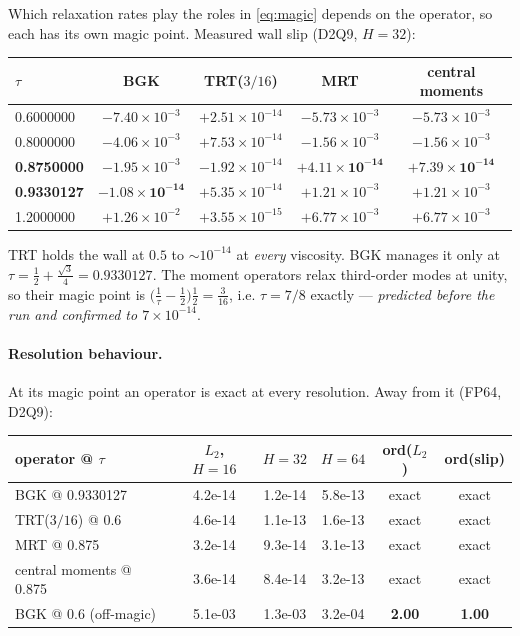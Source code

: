 \documentclass[11pt,a4paper]{article}
\begin{document}
Which relaxation rates play the roles in \eqref{eq:magic} depends on the operator,
so each has its own magic point. Measured wall slip (D2Q9, $H=32$):

\begin{center}\small
\begin{tabular}{lcccc}
\toprule
$\tau$ & BGK & TRT($3/16$) & MRT & central moments \\
\midrule
0.6000000 & $-7.40\times10^{-3}$ & $+2.51\times10^{-14}$ & $-5.73\times10^{-3}$ & $-5.73\times10^{-3}$ \\
0.8000000 & $-4.06\times10^{-3}$ & $+7.53\times10^{-14}$ & $-1.56\times10^{-3}$ & $-1.56\times10^{-3}$ \\
\textbf{0.8750000} & $-1.95\times10^{-3}$ & $-1.92\times10^{-14}$ & $\bm{+4.11\times10^{-14}}$ & $\bm{+7.39\times10^{-14}}$ \\
\textbf{0.9330127} & $\bm{-1.08\times10^{-14}}$ & $+5.35\times10^{-14}$ & $+1.21\times10^{-3}$ & $+1.21\times10^{-3}$ \\
1.2000000 & $+1.26\times10^{-2}$ & $+3.55\times10^{-15}$ & $+6.77\times10^{-3}$ & $+6.77\times10^{-3}$ \\
\bottomrule
\end{tabular}
\end{center}

\noindent TRT holds the wall at $0.5$ to $\sim10^{-14}$ at \emph{every} viscosity.
BGK manages it only at $\tau=\tfrac12+\tfrac{\sqrt3}{4}=0.9330127$. The moment
operators relax third-order modes at unity, so their magic point is
$\big(\tfrac{1}{\tau}-\tfrac12\big)\tfrac12=\tfrac{3}{16}$, i.e.
$\tau=7/8$ exactly --- \emph{predicted before the run and confirmed to
$7\times10^{-14}$}.

\paragraph{Resolution behaviour.} At its magic point an operator is exact at every
resolution. Away from it (FP64, D2Q9):

\begin{center}\small
\begin{tabular}{lccccc}
\toprule
operator @ $\tau$ & $L_2$, $H{=}16$ & $H{=}32$ & $H{=}64$ & ord($L_2$) & ord(slip) \\
\midrule
BGK @ 0.9330127        & 4.2e-14 & 1.2e-14 & 5.8e-13 & exact & exact \\
TRT($3/16$) @ 0.6      & 4.6e-14 & 1.1e-13 & 1.6e-13 & exact & exact \\
MRT @ 0.875            & 3.2e-14 & 9.3e-14 & 3.1e-13 & exact & exact \\
central moments @ 0.875& 3.6e-14 & 8.4e-14 & 3.2e-13 & exact & exact \\
BGK @ 0.6 (off-magic)  & 5.1e-03 & 1.3e-03 & 3.2e-04 & \textbf{2.00} & \textbf{1.00} \\
\bottomrule
\end{tabular}
\end{center}
\end{document}
